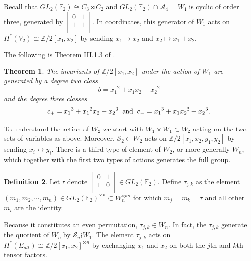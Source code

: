 \documentclass{article}
\theoremstyle{plain}
\newtheorem{theorem}{Theorem}
\theoremstyle{definition}
\newtheorem{definition}[theorem]{Definition}
\newcommand{\F}{\mathbb{F}}
\newcommand{\Z}{\mathbb{Z}}
\newcommand{\si}{\mathcal{S}}
\newcommand{\alt}{\mathcal{A}}
\begin{document}
Recall  that $GL_2( \F_2) \cong C_3 \rtimes C_2$ and $GL_2( \F_2) \cap \alt_4 
 = W_1$ is cyclic of order three, generated by  $\begin{bmatrix}
        0 & 1 \\ 1 & 1 \\
    \end{bmatrix}$.  
In coordinates, this generator of $W_1$ acts on $H^*(V_2) \cong \Z/2[x_1, x_2]$ by sending $x_1 \mapsto x_2$ and $x_2 \mapsto x_1 + x_2$.

The following is Theorem III.1.3 of \cite{AdMi94}.


\begin{theorem}\label{admi}
The invariants of $\Z/2[x_1, x_2]$ under the action of  $W_1$  are generated by a degree two class $$b = {x_1}^2 + x_1x_2 + {x_2}^2$$ and the degree three classes 
$$c_+ = {x_1}^3+{x_1}^2x_2+{x_2}^3 \;\; {\rm and} \;\; c_- = {x_1}^3+x_1{x_2}^2+{x_2}^3.$$  
\end{theorem}

To understand the action of $W_2$ we start with
$W_1 \times W_1 \subset W_2$
acting on the two sets of variables as above. 
Moreover, $\si_2 \subset W_2$ acts on $\Z/2[x_1, x_2, y_1, y_2]$ by sending $x_i \leftrightarrow y_i$. 
There is a third type of element  of $W_2$, or
more generally $W_n$, which together with the first two types of actions generates the full group.

\begin{definition}
    Let $\tau$ denote  $\begin{bmatrix}
        0 & 1 \\ 1 & 0 \\
    \end{bmatrix} \in GL_2( \F_2)$. Define $\tau_{j,k}$ as 
    the element  $(m_1, m_2, \cdots, m_n) \in  GL_2( \F_2)^{\times n} \subset
    W_n^{sym}$ for which
    $m_j = m_k = \tau$ and all other $m_i$ are the identity.  
\end{definition}

Because it constitutes an even permutation, $\tau_{j,k} \in W_n$.   In fact, the $\tau_{j,k}$ generate the quotient
of $W_n$ by $\si_n \wr W_1$. 
The element $\tau_{j,k}$ acts on $H^*(E_{alt}) \cong  \Z/2[x_1, x_2]^{\otimes n}$ by exchanging 
$x_1$ and $x_2$ on both the $j$th and $k$th tensor factors.
\end{document}
